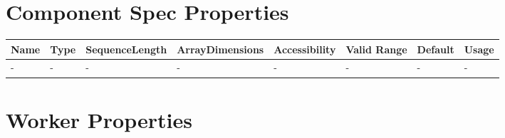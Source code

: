 \documentclass{article}
\begin{document}
\begin{landscape}

	\section*{Component Spec Properties}
	\begin{scriptsize}
		\begin{tabular}{|p{3.75cm}|p{1.25cm}|p{2cm}|p{2.75cm}|p{1.5cm}|p{1.5cm}|p{1cm}|p{6.73cm}|}
			\hline
			\rowcolor{blue}
			Name               & Type & SequenceLength & ArrayDimensions & Accessibility      & Valid Range & Default & Usage                                                                               \\
			\hline
			- & - & - & - & - & - & - & - \\
			\hline
		\end{tabular}
	\end{scriptsize}

	\section*{Worker Properties}

\end{landscape}
\end{document}
